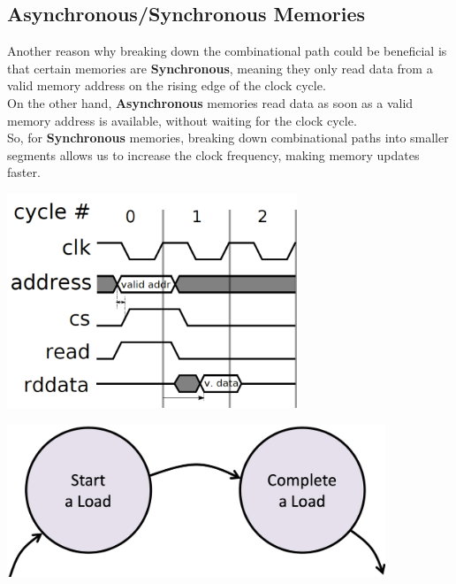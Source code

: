 \subsection{Asynchronous/Synchronous Memories}
Another reason why breaking down the combinational path could be beneficial is that certain memories are \textbf{Synchronous}, meaning they only read data from a valid memory address on the rising edge of the clock cycle. \\ 
On the other hand, \textbf{Asynchronous} memories read data as soon as a valid memory address is available, without waiting for the clock cycle.\\ \vspace*{5px}
So, for \textbf{Synchronous} memories, breaking down combinational paths into smaller segments allows us to increase the clock frequency, making memory updates faster. \\ \vspace*{5px}
\begin{minipage}[htp]{0.45\textwidth}
    \begin{center}
        \includegraphics[width=0.65\textwidth]{chapters/chapter2a/images/seq_memory.png}
    \end{center}
\end{minipage}
\hfill
\vline
\hfill
\begin{minipage}[htp]{0.45\textwidth}
    \begin{center}
        \includegraphics[width=0.85\textwidth]{chapters/chapter2a/images/seq_memory2.png}
    \end{center}
\end{minipage}

